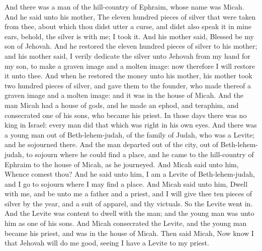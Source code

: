 And there was a man of the hill-country of Ephraim, whose name was Micah. And he said unto his mother, The eleven hundred pieces of silver that were taken from thee, about which thou didst utter a curse, and didst also speak it in mine ears, behold, the silver is with me; I took it. And his mother said, Blessed be my son of Jehovah. And he restored the eleven hundred pieces of silver to his mother; and his mother said, I verily dedicate the silver unto Jehovah from my hand for my son, to make a graven image and a molten image: now therefore I will restore it unto thee. And when he restored the money unto his mother, his mother took two hundred pieces of silver, and gave them to the founder, who made thereof a graven image and a molten image: and it was in the house of Micah. And the man Micah had a house of gods, and he made an ephod, and teraphim, and consecrated one of his sons, who became his priest. In those days there was no king in Israel: every man did that which was right in his own eyes.  And there was a young man out of Beth-lehem-judah, of the family of Judah, who was a Levite; and he sojourned there. And the man departed out of the city, out of Beth-lehem-judah, to sojourn where he could find a place, and he came to the hill-country of Ephraim to the house of Micah, as he journeyed. And Micah said unto him, Whence comest thou? And he said unto him, I am a Levite of Beth-lehem-judah, and I go to sojourn where I may find a place. And Micah said unto him, Dwell with me, and be unto me a father and a priest, and I will give thee ten pieces of silver by the year, and a suit of apparel, and thy victuals. So the Levite went in. And the Levite was content to dwell with the man; and the young man was unto him as one of his sons. And Micah consecrated the Levite, and the young man became his priest, and was in the house of Micah. Then said Micah, Now know I that Jehovah will do me good, seeing I have a Levite to my priest. 

